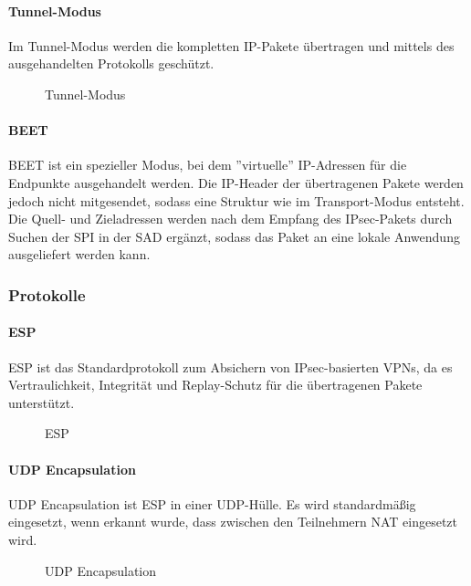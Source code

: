 \paragraph{Tunnel-Modus}
Im Tunnel-Modus werden die kompletten \ac{IP}-Pakete übertragen und mittels des ausgehandelten
Protokolls geschützt.

\begin{figure}
    \caption{Tunnel-Modus}
    \label{fig:Tunnel-Modus}
    \centering
    \def\svgwidth{\columnwidth}
    
\end{figure}

\paragraph{BEET}
\ac{BEET} ist ein spezieller Modus, bei dem ''virtuelle'' \ac{IP}-Adressen für die Endpunkte
ausgehandelt werden. Die \ac{IP}-Header der übertragenen Pakete werden jedoch nicht mitgesendet,
sodass eine Struktur wie im Transport-Modus entsteht. Die Quell- und Zieladressen
werden nach dem Empfang des \ac{IPsec}-Pakets durch Suchen der \ac{SPI} in der \ac{SAD}
ergänzt, sodass das Paket an eine lokale Anwendung ausgeliefert werden kann.

\subsubsection{Protokolle}

\paragraph{ESP}
\ac{ESP} ist das Standardprotokoll zum Absichern von \ac{IPsec}-basierten \acp{VPN},
da es Vertraulichkeit, Integrität und Replay-Schutz für die übertragenen Pakete unterstützt.
\begin{figure}
    \label{fig:ESP}
    \centering
    \def\svgwidth{\columnwidth}
    
    \caption{\ac{ESP}}
\end{figure}

\paragraph{UDP Encapsulation}
UDP Encapsulation ist \ac{ESP} in einer UDP-Hülle. Es wird standardmäßig eingesetzt, wenn
erkannt wurde, dass zwischen den Teilnehmern \ac{NAT} eingesetzt wird.
\begin{figure}
    \label{fig:UDP-Encapsulation}
    \centering
    \def\svgwidth{\columnwidth}
    
    \caption{UDP Encapsulation}
\end{figure}

